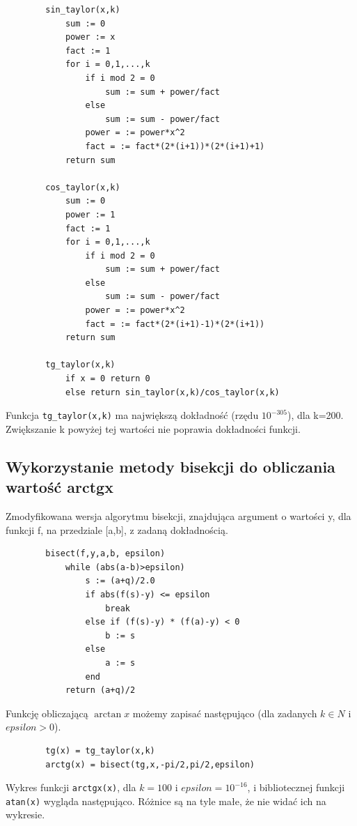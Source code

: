 \documentclass[11pt,a4paper]{article}
\begin{document}
    \begin{verbatim}
        sin_taylor(x,k)
            sum := 0
            power := x
            fact := 1
            for i = 0,1,...,k
                if i mod 2 = 0
                    sum := sum + power/fact
                else
                    sum := sum - power/fact
                power = := power*x^2
                fact = := fact*(2*(i+1))*(2*(i+1)+1)
            return sum

        cos_taylor(x,k)
            sum := 0
            power := 1
            fact := 1
            for i = 0,1,...,k
                if i mod 2 = 0
                    sum := sum + power/fact
                else
                    sum := sum - power/fact
                power = := power*x^2
                fact = := fact*(2*(i+1)-1)*(2*(i+1))
            return sum

        tg_taylor(x,k)
            if x = 0 return 0
            else return sin_taylor(x,k)/cos_taylor(x,k)
    \end{verbatim}

    Funkcja \verb!tg_taylor(x,k)! ma największą dokładność (rzędu $10^{-305}$), dla k=200. Zwiększanie k powyżej tej wartości nie poprawia dokładności funkcji.
    
    \subsection{Wykorzystanie metody bisekcji do obliczania wartość arctgx}

    Zmodyfikowana wersja algorytmu bisekcji, znajdująca argument o wartości y, dla funkcji f, na przedziale [a,b], z zadaną dokładnością.

    \begin{verbatim}
        bisect(f,y,a,b, epsilon)
            while (abs(a-b)>epsilon)
                s := (a+q)/2.0
                if abs(f(s)-y) <= epsilon
                    break
                else if (f(s)-y) * (f(a)-y) < 0
                    b := s 
                else
                    a := s
                end
            return (a+q)/2
    \end{verbatim}
    Funkcję obliczającą $\arctan{x}$ możemy zapisać następująco (dla zadanych $k \in N$ i $epsilon > 0$).
    \begin{verbatim}
        tg(x) = tg_taylor(x,k)
        arctg(x) = bisect(tg,x,-pi/2,pi/2,epsilon)
    \end{verbatim}

    Wykres funkcji \verb!arctgx(x)!, dla $k=100$ i $epsilon=10^{-16}$, i bibliotecznej funkcji \verb!atan(x)! wygląda następująco. Różnice są na tyle małe, że nie widać ich na wykresie.\\
\end{document}
